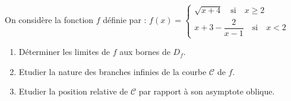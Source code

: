 \begin{exercice}
On considère la fonction $ f $ définie par :
$ f (x)=\left\{\begin{array}{l} \sqrt{x +4}\quad \text{si} \quad x\geq 2 \\ x+3-\dfrac{2}{x-1}\quad \text{si}\quad x< 2  \end{array} \right.$

\begin{enumerate}
\item Déterminer  les limites de $f$ aux bornes de $ D_{f} $.
\item Etudier la nature des branches infinies de la courbe $ \mathcal{C} $ de $f$.
\item Etudier la position relative de $ \mathcal{C} $ par rapport à son asymptote oblique.
\end{enumerate}
\end{exercice}
